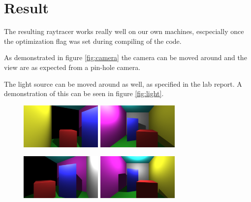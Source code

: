 \documentclass[a4]{article}
\begin{document}
\section{Result}
The resulting raytracer works really well on our own machines, escpecially once
the optimization flag was set during compiling of the code. 

As demonstrated in figure \ref{fig:camera} the camera can be moved around and
the view are as expected from a pin-hole camera.

The light source can be moved around as well, as specified in the lab report. A
demonstration of this can be seen in figure \ref{fig:light}.

\begin{figure}[H]
    \centering
    \begin{minipage}{.5\textwidth}
        \centering
        \includegraphics[width=4cm]{720ani0.png}
    \end{minipage}%
    \begin{minipage}{.5\textwidth}
        \centering
        \includegraphics[width=4cm]{light0.png}
    \end{minipage}
\end{figure}

\begin{figure}[H]
    \centering
    \begin{minipage}{.5\textwidth}
        \centering
        \includegraphics[width=4cm]{720ani1.png}
    \end{minipage}%
    \begin{minipage}{.5\textwidth}
        \centering
        \includegraphics[width=4cm]{light1.png}
    \end{minipage}
\end{figure}
\end{document}
